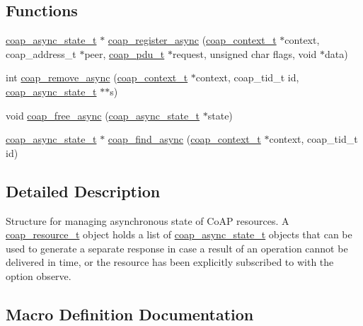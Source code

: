 \subsection*{Functions}
\begin{DoxyCompactItemize}
\item 
\hyperlink{structcoap__async__state__t}{coap\+\_\+async\+\_\+state\+\_\+t} $\ast$ \hyperlink{group__coap__async_ga1c81eb1d464e9b5195acb7ae630e15c9}{coap\+\_\+register\+\_\+async} (\hyperlink{structcoap__context__t}{coap\+\_\+context\+\_\+t} $\ast$context, coap\+\_\+address\+\_\+t $\ast$peer, \hyperlink{structcoap__pdu__t}{coap\+\_\+pdu\+\_\+t} $\ast$request, unsigned char flags, void $\ast$data)
\item 
int \hyperlink{group__coap__async_ga5ebdd339b85d066d741adf64ce51fe0b}{coap\+\_\+remove\+\_\+async} (\hyperlink{structcoap__context__t}{coap\+\_\+context\+\_\+t} $\ast$context, coap\+\_\+tid\+\_\+t id, \hyperlink{structcoap__async__state__t}{coap\+\_\+async\+\_\+state\+\_\+t} $\ast$$\ast$s)
\item 
void \hyperlink{group__coap__async_ga32024a34a383832e6692d3a439fc67c7}{coap\+\_\+free\+\_\+async} (\hyperlink{structcoap__async__state__t}{coap\+\_\+async\+\_\+state\+\_\+t} $\ast$state)
\item 
\hyperlink{structcoap__async__state__t}{coap\+\_\+async\+\_\+state\+\_\+t} $\ast$ \hyperlink{group__coap__async_ga3c064a99c809502d8b584dbbd0d96bd2}{coap\+\_\+find\+\_\+async} (\hyperlink{structcoap__context__t}{coap\+\_\+context\+\_\+t} $\ast$context, coap\+\_\+tid\+\_\+t id)
\end{DoxyCompactItemize}


\subsection{Detailed Description}
Structure for managing asynchronous state of Co\+A\+P resources. A \hyperlink{structcoap__resource__t}{coap\+\_\+resource\+\_\+t} object holds a list of \hyperlink{structcoap__async__state__t}{coap\+\_\+async\+\_\+state\+\_\+t} objects that can be used to generate a separate response in case a result of an operation cannot be delivered in time, or the resource has been explicitly subscribed to with the option {\ttfamily observe}. 

\subsection{Macro Definition Documentation}
\hypertarget{group__coap__async_gaf3c112eaa3f262731ed3507a228bf776}{}
